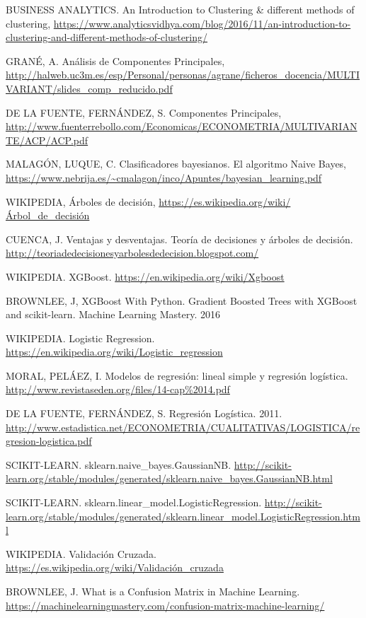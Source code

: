 \begin{thebibliography}{1}
	BUSINESS ANALYTICS. An Introduction to Clustering \& different methods of clustering,
	\url{https://www.analyticsvidhya.com/blog/2016/11/an-introduction-to-clustering-and-different-methods-of-clustering/}
	
	GRANÉ, A. Análisis de Componentes Principales,
	\url{http://halweb.uc3m.es/esp/Personal/personas/agrane/ficheros_docencia/MULTIVARIANT/slides_comp_reducido.pdf}
	
	DE LA FUENTE, FERNÁNDEZ, S. Componentes Principales,
	\url{http://www.fuenterrebollo.com/Economicas/ECONOMETRIA/MULTIVARIANTE/ACP/ACP.pdf}
	
	MALAGÓN, LUQUE, C. Clasificadores bayesianos. El algoritmo Naive Bayes,
	\url{https://www.nebrija.es/~cmalagon/inco/Apuntes/bayesian_learning.pdf}
	
	WIKIPEDIA,  Árboles de decisión,
	\url{https://es.wikipedia.org/wiki/Árbol_de_decisión}
	
	CUENCA, J.  Ventajas y desventajas. Teoría de decisiones y árboles de decisión.
	\url{http://teoriadedecisionesyarbolesdedecision.blogspot.com/}	
	
	WIKIPEDIA. XGBoost.
	\url{https://en.wikipedia.org/wiki/Xgboost}		
	
	BROWNLEE, J,  XGBoost With Python. Gradient Boosted Trees with XGBoost and scikit-learn. Machine Learning Mastery. 2016
	
	WIKIPEDIA. Logistic Regression.
	\url{https://en.wikipedia.org/wiki/Logistic_regression}	
	
	MORAL, PELÁEZ, I.  Modelos de regresión: lineal simple y regresión logística.
	\url{http://www.revistaseden.org/files/14-cap\%2014.pdf}
	
	DE LA FUENTE, FERNÁNDEZ, S.  Regresión Logística. 2011.
	\url{http://www.estadistica.net/ECONOMETRIA/CUALITATIVAS/LOGISTICA/regresion-logistica.pdf}	
	
	SCIKIT-LEARN.  sklearn.naive\_bayes.GaussianNB.
	\url{http://scikit-learn.org/stable/modules/generated/sklearn.naive_bayes.GaussianNB.html}
	
	SCIKIT-LEARN.  sklearn.linear\_model.LogisticRegression.
	\url{http://scikit-learn.org/stable/modules/generated/sklearn.linear_model.LogisticRegression.html}
	
	WIKIPEDIA. Validación Cruzada.
	\url{https://es.wikipedia.org/wiki/Validación\_cruzada}
	
	BROWNLEE, J. What is a Confusion Matrix in Machine Learning.
	\url{https://machinelearningmastery.com/confusion-matrix-machine-learning/}
\end{thebibliography}


